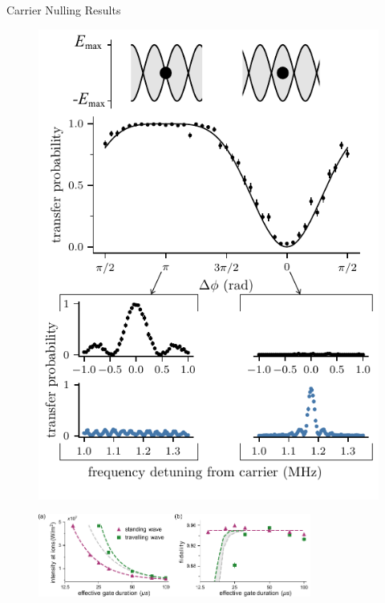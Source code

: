 \documentclass[final]{beamer}
\begin{document}
\begin{frame}{}
\begin{center}
\begin{columns}[t]
\begin{column}{0.49\textwidth}
\begin{alertblock}{Carrier Nulling Results}
\begin{minipage}{0.34\linewidth}
\begin{figure}
{\begin{minipage}{\textwidth}
        \includegraphics[width=\textwidth]{./figs/Figure_2_v2.pdf}
        \end{minipage}
        }
      \end{figure}
      \end{minipage}
      \begin{figure}
        \includegraphics[width=0.8\textwidth]{./figs/two_qubit_gate_figure_h.pdf}
      \end{figure}
    \end{alertblock}



\end{column}
\end{columns}
\end{center}
\end{frame}
\end{document}
